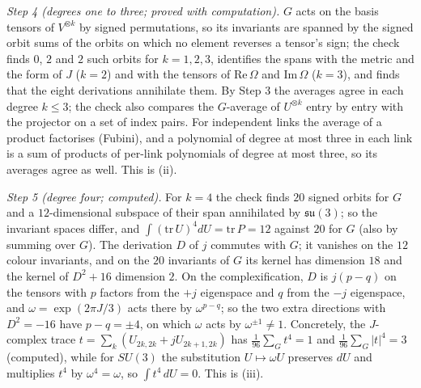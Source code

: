 \emph{Step 4 (degrees one to three; proved with computation).} $G$ acts on the basis tensors of $V^{\otimes k}$ by signed permutations, so its invariants are spanned by the signed orbit sums of the orbits on which no element reverses a tensor's sign; the check finds $0$, $2$ and $2$ such orbits for $k = 1, 2, 3$, identifies the spans with the metric and the form of $J$ ($k = 2$) and with the tensors of $\mathrm{Re}\,\Omega$ and $\mathrm{Im}\,\Omega$ ($k = 3$), and finds that the eight derivations annihilate them. By Step 3 the averages agree in each degree $k \le 3$; the check also compares the $G$-average of $U^{\otimes k}$ entry by entry with the projector on a set of index pairs. For independent links the average of a product factorises (Fubini), and a polynomial of degree at most three in each link is a sum of products of per-link polynomials of degree at most three, so its averages agree as well. This is (ii).

\emph{Step 5 (degree four; computed).} For $k = 4$ the check finds $20$ signed orbits for $G$ and a $12$-dimensional subspace of their span annihilated by $\mathfrak{su}(3)$; so the invariant spaces differ, and $\int(\mathrm{tr}\,U)^{4}dU = \mathrm{tr}\,P = 12$ against $20$ for $G$ (also by summing over $G$). The derivation $D$ of $j$ commutes with $G$; it vanishes on the $12$ colour invariants, and on the $20$ invariants of $G$ its kernel has dimension $18$ and the kernel of $D^{2} + 16$ dimension $2$. On the complexification, $D$ is $j(p - q)$ on the tensors with $p$ factors from the $+j$ eigenspace and $q$ from the $-j$ eigenspace, and $\omega = \exp(2\pi J/3)$ acts there by $\omega^{p - q}$; so the two extra directions with $D^{2} = -16$ have $p - q = \pm4$, on which $\omega$ acts by $\omega^{\pm1} \neq 1$. Concretely, the $J$-complex trace $t = \sum_{k}(U_{2k,2k} + jU_{2k+1,2k})$ has $\tfrac{1}{96}\sum_{G}t^{4} = 1$ and $\tfrac{1}{96}\sum_{G}|t|^{4} = 3$ (computed), while for $SU(3)$ the substitution $U \mapsto \omega U$ preserves $dU$ and multiplies $t^{4}$ by $\omega^{4} = \omega$, so $\int t^{4}\,dU = 0$. This is (iii).

